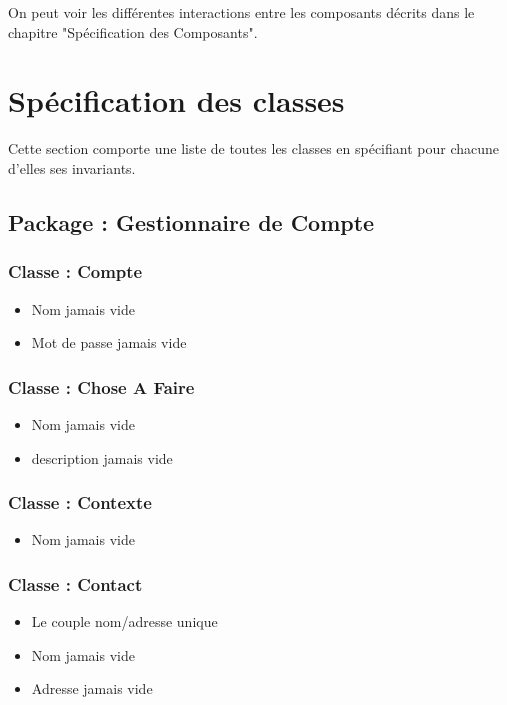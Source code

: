 On peut voir les différentes interactions entre les composants décrits dans le chapitre "Spécification des Composants".


\section{Spécification des classes}

Cette section comporte une liste de toutes les classes en spécifiant pour chacune d'elles ses invariants.\\


\subsection*{Package : Gestionnaire de Compte}

\subsubsection*{Classe : Compte} 
\begin{itemize}
\item Nom jamais vide
\item Mot de passe jamais vide
\end{itemize}


\subsubsection*{Classe : Chose A Faire}
\begin{itemize}
\item Nom jamais vide
\item description jamais vide
\end{itemize} 

\subsubsection*{Classe : Contexte}
\begin{itemize}
\item Nom jamais vide
\end{itemize} 

\subsubsection*{Classe : Contact}
\begin{itemize}
\item Le couple nom/adresse unique
\item Nom jamais vide
\item Adresse jamais vide
\end{itemize} 

